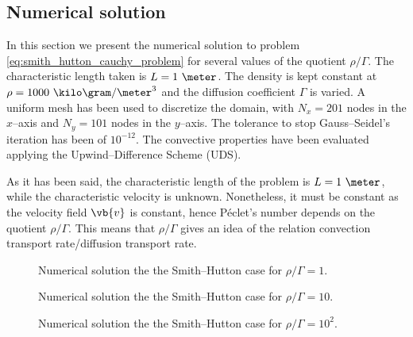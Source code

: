 
\subsection{Numerical solution}

In this section we present the numerical solution to problem \eqref{eq:smith_hutton_cauchy_problem} for several values of the quotient $\rho / \Gamma$. The characteristic length taken is $L = 1 \ \meter$. The density is kept constant at $\rho = 1000 \ \kilo\gram / \meter^3$ and the diffusion coefficient $\Gamma$ is varied. A uniform mesh has been used to discretize the domain, with $N_x = 201$ nodes in the $x$--axis and $N_y = 101$ nodes in the $y$--axis. The tolerance to stop Gauss--Seidel's iteration has been of $10^{-12}$. The convective properties have been evaluated applying the Upwind--Difference Scheme (UDS). 

As it has been said, the characteristic length of the problem is $L = 1 \ \meter$, while the characteristic velocity is unknown. Nonetheless, it must be constant as the velocity field $\vb{v}$ is constant, hence Péclet's number depends on the quotient $\rho / \Gamma$. This means that $\rho / \Gamma$ gives an idea of the relation convection transport rate/diffusion transport rate.


\begin{figure}[ht]
	\centering
	
	\caption{Numerical solution the the Smith--Hutton case for $\rho / \Gamma = 1$.}
	\label{fig:smith_hutton_N201_Pe1.0e+00}
\end{figure}

\begin{figure}[ht]
	\centering
	
	\caption{Numerical solution the the Smith--Hutton case for $\rho / \Gamma = 10$.}
	\label{fig:smith_hutton_N201_Pe1.0e+01}
\end{figure}

\begin{figure}[ht]
	\centering
	
	\caption{Numerical solution the the Smith--Hutton case for $\rho / \Gamma = 10^2$.}
	\label{fig:smith_hutton_N201_Pe1.0e+02}
\end{figure}


